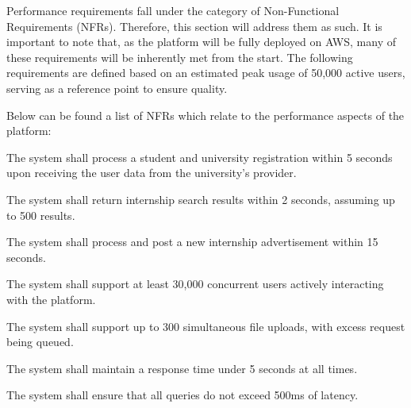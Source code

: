 Performance requirements fall under the category of Non-Functional Requirements (NFRs). Therefore, this section will address them as such. It is important to note that, as the platform will be fully deployed on AWS, many of these requirements will be inherently met from the start. The following requirements are defined based on an estimated peak usage of 50,000 active users, serving as a reference point to ensure quality.

Below can be found a list of NFRs which relate to the performance aspects of the platform:

\begin{enumerate}[label={\textbf{[NFR-P\arabic*]}}]
   \item The system shall process a student and university registration within 5 seconds upon receiving the user data from the university's provider.  
   \item The system shall return internship search results within 2 seconds, assuming up to 500 results.
   \item The system shall process and post a new internship advertisement within 15 seconds.
   \item The system shall support at least 30,000 concurrent users actively interacting with the platform.
   \item The system shall support up to 300 simultaneous file uploads, with excess request being queued.
   \item The system shall maintain a response time under 5 seconds at all times.
   \item The system shall ensure that all queries do not exceed 500ms of latency.
\end{enumerate}


